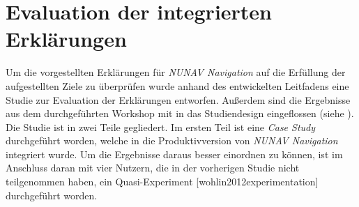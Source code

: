 \section{Evaluation der integrierten Erklärungen}
\label{sec:02_evaluation_explanations}

Um die vorgestellten Erklärungen für \textit{NUNAV Navigation} auf die Erfüllung der aufgestellten Ziele zu überprüfen wurde anhand des entwickelten Leitfadens eine Studie zur Evaluation der Erklärungen entworfen. Außerdem sind die Ergebnisse aus dem durchgeführten Workshop mit in das Studiendesign eingeflossen (siehe ). Die Studie ist in zwei Teile gegliedert. Im ersten Teil ist eine \textit{Case Study} \cite{wohlin2012experimentation} durchgeführt worden, welche in die Produktivversion von \textit{NUNAV Navigation} integriert wurde. Um die Ergebnisse daraus besser einordnen zu können, ist im Anschluss daran mit vier Nutzern, die in der vorherigen Studie nicht teilgenommen haben, ein Quasi-Experiment [wohlin2012experimentation] durchgeführt worden.








